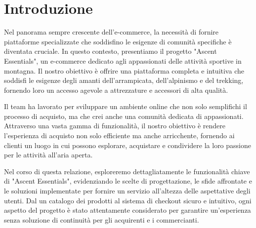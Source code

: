 \chapter{Introduzione}
Nel panorama sempre crescente dell'e-commerce, la necessità di fornire piattaforme specializzate che soddisfino le esigenze di comunità specifiche è diventata cruciale. In questo contesto, presentiamo il progetto "Ascent Essentials", un e-commerce dedicato agli appassionati delle attività sportive in montagna. Il nostro obiettivo è offrire una piattaforma completa e intuitiva che soddisfi le esigenze degli amanti dell'arrampicata, dell'alpinismo e del trekking, fornendo loro un accesso agevole a attrezzature e accessori di alta qualità.

Il team ha lavorato per sviluppare un ambiente online che non solo semplifichi il processo di acquisto, ma che crei anche una comunità dedicata di appassionati. Attraverso una vasta gamma di funzionalità, il nostro obiettivo è rendere l'esperienza di acquisto non solo efficiente ma anche arricchente, fornendo ai clienti un luogo in cui possono esplorare, acquistare e condividere la loro passione per le attività all'aria aperta.

Nel corso di questa relazione, esploreremo dettagliatamente le funzionalità chiave di "Ascent Essentials", evidenziando le scelte di progettazione, le sfide affrontate e le soluzioni implementate per fornire un servizio all'altezza delle aspettative degli utenti. Dal un catalogo dei prodotti al sistema di checkout sicuro e intuitivo, ogni aspetto del progetto è stato attentamente considerato per garantire un'esperienza senza soluzione di continuità per gli acquirenti e i commercianti.